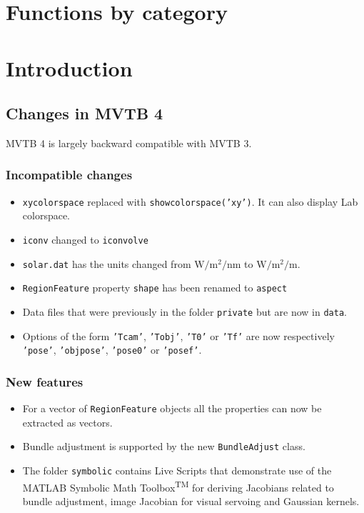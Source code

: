 \documentclass[a4paper,twoside]{report}
\begin{document}
\newpage
\tableofcontents
\newpage
\chapter*{Functions by category}
\begin{multicols}{2}

\end{multicols}
\newpage
\chapter{Introduction}
\section{Changes in MVTB 4}
MVTB 4 is largely backward compatible with MVTB 3.

\subsection{Incompatible changes}
\begin{itemize}
\item \texttt{xycolorspace} replaced with \texttt{showcolorspace('xy')}.  It can also display Lab colorspace.
\item \texttt{iconv} changed to \texttt{iconvolve}
\item \texttt{solar.dat} has the units changed from $\mathrm{W/m^2/nm}$ to $\mathrm{W/m^2/m}$.
\item \texttt{RegionFeature} property \texttt{shape} has been renamed to  \texttt{aspect}
\item Data files that were previously in the folder \texttt{private} but are now in \texttt{data}.
\item Options of the form \texttt{'Tcam'}, \texttt{'Tobj'}, \texttt{'T0'} or \texttt{'Tf'} are now respectively 
\texttt{'pose'}, \texttt{'objpose'}, \texttt{'pose0'} or \texttt{'posef'}.
\end{itemize}


\subsection{New features}
\begin{itemize}
\item For a vector of \texttt{RegionFeature} objects all the properties can now be extracted as vectors.
\item Bundle adjustment is supported by the new \texttt{BundleAdjust} class.
\item The folder \texttt{symbolic} contains Live Scripts that demonstrate use of the MATLAB Symbolic Math Toolbox\textsuperscript{TM}
for deriving Jacobians related to bundle adjustment, image Jacobian for visual servoing and Gaussian kernels.
\end{itemize}
\end{document}
